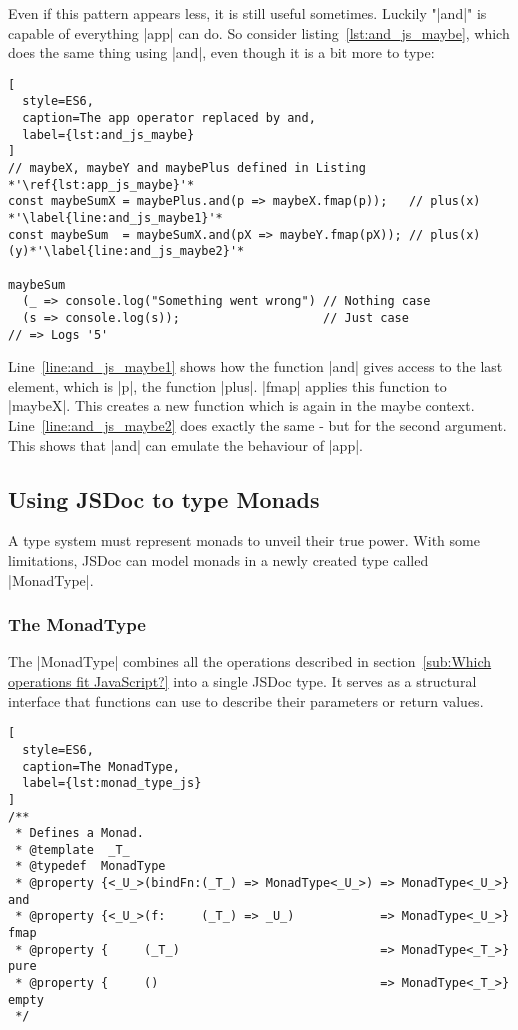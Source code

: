 Even if this pattern appears less, it is still useful sometimes. Luckily
"|and|" is capable of everything |app| can do. So consider
listing~\ref{lst:and_js_maybe}, which does the same thing using |and|, even
though it is a bit more to type:

\begin{lstlisting}[
  style=ES6,
  caption=The app operator replaced by and,
  label={lst:and_js_maybe}
]
// maybeX, maybeY and maybePlus defined in Listing *'\ref{lst:app_js_maybe}'*
const maybeSumX = maybePlus.and(p => maybeX.fmap(p));   // plus(x) *'\label{line:and_js_maybe1}'*
const maybeSum  = maybeSumX.and(pX => maybeY.fmap(pX)); // plus(x)(y)*'\label{line:and_js_maybe2}'*

maybeSum 
  (_ => console.log("Something went wrong") // Nothing case
  (s => console.log(s));                    // Just case
// => Logs '5'
\end{lstlisting}

Line~\ref{line:and_js_maybe1} shows how the function |and| gives access to the
last element, which is |p|, the function |plus|. |fmap| applies this function
to |maybeX|. This creates a new function which is again in the maybe context.
Line~\ref{line:and_js_maybe2} does exactly the same - but for the second
argument. \\ 
This shows that |and| can emulate the behaviour of |app|.

\subsection{Using JSDoc to type Monads} %
\label{sub:Using JSDoc to type monads}
A type system must represent monads to unveil their true power. With some
limitations, JSDoc can model monads in a newly created type called |MonadType|.

\subsubsection{The MonadType} %
\label{subsub:The MonadType}
The |MonadType| combines all the operations described in
section~\ref{sub:Which operations fit JavaScript?} into a single JSDoc type.
It serves as a structural interface that functions can use to describe their
parameters or return values.

\begin{lstlisting}[
  style=ES6,
  caption=The MonadType,
  label={lst:monad_type_js}
]
/**
 * Defines a Monad.
 * @template  _T_
 * @typedef  MonadType
 * @property {<_U_>(bindFn:(_T_) => MonadType<_U_>) => MonadType<_U_>} and
 * @property {<_U_>(f:     (_T_) => _U_)            => MonadType<_U_>} fmap
 * @property {     (_T_)                            => MonadType<_T_>} pure
 * @property {     ()                               => MonadType<_T_>} empty
 */
\end{lstlisting}

